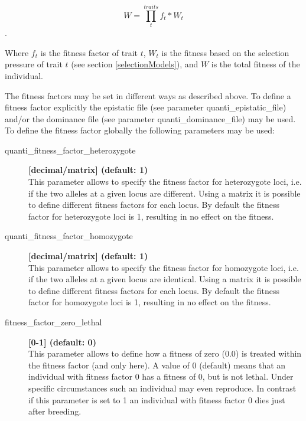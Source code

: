 \documentclass[letterpaper,12pt,oneside]{book}
\begin{document}
	\[W = \prod_{t}^{traits}f_{t}*W_{t}\].
	


Where $f_{t}$ is the fitness factor of trait $t$, $W_{t}$ is the fitness based on the selection pressure of trait $t$ (see section \ref{selectionModels}), and $W$ is the total fitness of the individual.

The fitness factors may be set in different ways as described above. To define a fitness factor explicitly the epistatic file (see parameter \textsf{quanti\_epistatic\_file}) and/or the dominance file (see parameter \textsf{quanti\_dominance\_file}) may be used. To define the fitness factor globally the following parameters may be used:
    
\begin{description}
\item[quanti\_fitness\_factor\_heterozygote] \textbf{[decimal/matrix] (default: 1)}\\
This parameter allows to specify the fitness factor for heterozygote loci, i.e. if the two alleles at a given locus are different. Using a matrix it is possible to define different fitness factors for each locus. By default the fitness factor for heterozygote loci is 1, resulting in no effect on the fitness. 

\item[quanti\_fitness\_factor\_homozygote] \textbf{[decimal/matrix] (default: 1)}\\
This parameter allows to specify the fitness factor for homozygote loci, i.e. if the two alleles at a given locus are identical. Using a matrix it is possible to define different fitness factors for each locus. By default the fitness factor for homozygote loci is 1, resulting in no effect on the fitness. 

\item[fitness\_factor\_zero\_lethal] \textbf{[0-1] (default: 0)}\\
This parameter allows to define how a fitness of zero (0.0) is treated within the fitness factor (and only here). A value of 0 (default) means that an individual with fitness factor  0 has a fitness of 0, but is not lethal. Under specific circumstances such an individual may even reproduce. In contrast if this parameter is set to 1 an individual with fitness factor 0 dies just after breeding.
\end{description}
\end{document}
